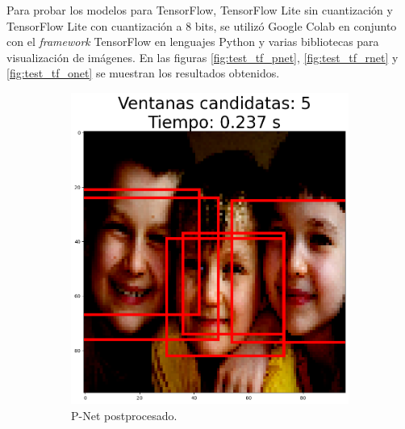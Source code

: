 Para probar los modelos para TensorFlow, TensorFlow Lite sin cuantización y TensorFlow Lite con cuantización a 8 bits, se utilizó Google Colab en conjunto con el \textit{framework} TensorFlow en lenguajes Python y varias bibliotecas para visualización de imágenes. En las figuras \ref{fig:test_tf_pnet}, \ref{fig:test_tf_rnet} y \ref{fig:test_tf_onet} se muestran los resultados obtenidos.

\begin{figure}[!htpb]
     \centering
     \begin{subfigure}[b]{0.28\textwidth}
         \centering
         \includegraphics[width=\textwidth]{./Figures/test_tf_pnet_a.png}
         \caption{P-Net postprocesado.}
         \label{fig:1de3}
     \end{subfigure}
     \hfill
     \begin{subfigure}[b]{0.28\textwidth}
         \centering

\end{subfigure}
\end{figure}
